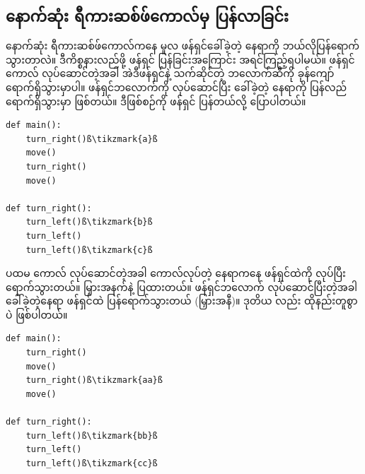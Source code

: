 \subsection*{နောက်ဆုံး ရီကားဆစ်ဖ်ကောလ်မှ ပြန်လာခြင်း}
နောက်ဆုံး ရီကားဆစ်ဖ်ကောလ်ကနေ မူလ ဖန်ရှင်ခေါ်ခဲ့တဲ့ နေရာကို ဘယ်လိုပြန်ရောက်သွားတာလဲ။ ဒီကိစ္စနားလည်ဖို့ ဖန်ရှင်  ပြန်ခြင်းအကြောင်း အရင်ကြည့်ရပါမယ်။ ဖန်ရှင်ကောလ် လုပ်ဆောင်တဲ့အခါ အဲဒီဖန်ရှင်နဲ့ သက်ဆိုင်တဲ့ ဘလောက်ဆီကို ခုန်ကျော် ရောက်ရှိသွားမှာပါ။ ဖန်ရှင်ဘလောက်ကို လုပ်ဆောင်ပြီး ခေါ်ခဲ့တဲ့ နေရာကို ပြန်လည်ရောက်ရှိသွားမှာ ဖြစ်တယ်။ ဒီဖြစ်စဉ်ကို ဖန်ရှင်  ပြန်တယ်လို့ ပြောပါတယ်။
%
\setlength{\fboxsep}{0pt}
\begin{verbatim}
def main():
    turn_right()ß\tikzmark{a}ß
    move()
    turn_right()
    move()

def turn_right():
    turn_left()ß\tikzmark{b}ß
    turn_left()
    turn_left()ß\tikzmark{c}ß
\end{verbatim}
%
ပထမ  ကောလ် လုပ်ဆောင်တဲ့အခါ ကောလ်လုပ်တဲ့ နေရာကနေ  ဖန်ရှင်ထဲကို  လုပ်ပြီး ရောက်သွားတယ်။ မြှားအနက်နဲ့ ပြထားတယ်။ ဖန်ရှင်ဘလောက် လုပ်ဆောင်ပြီးတဲ့အခါ ခေါ်ခဲ့တဲ့နေရာ  ဖန်ရှင်ထဲ ပြန်ရောက်သွားတယ် (မြှားအနီ)။ ဒုတိယ  လည်း ထိုနည်းတူစွာပဲ ဖြစ်ပါတယ်။


%
\setlength{\fboxsep}{0pt}
\begin{verbatim}
def main():
    turn_right()
    move()
    turn_right()ß\tikzmark{aa}ß
    move()

def turn_right():
    turn_left()ß\tikzmark{bb}ß
    turn_left()
    turn_left()ß\tikzmark{cc}ß
\end{verbatim}
\btwntikzannoandpar

